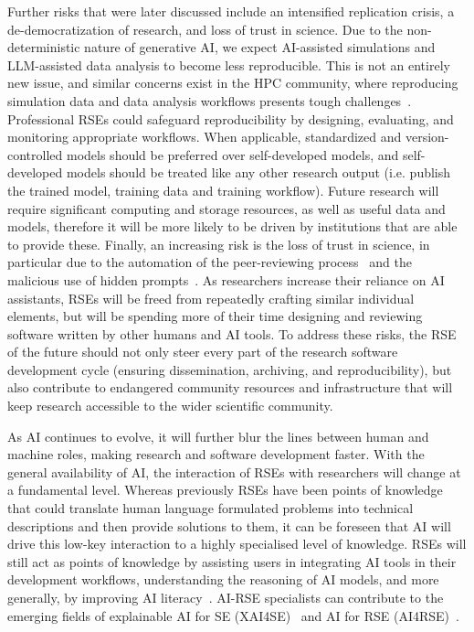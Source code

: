 \documentclass{eceasst}
\begin{document}
Further risks that were later discussed include an intensified replication crisis,
a de-democratization of research, and loss of trust in science.
Due to the non-deterministic nature of generative AI, we expect AI-assisted simulations
and LLM-assisted data analysis to become less reproducible.
This is not an entirely new issue, and similar concerns exist in the HPC community,
where reproducing simulation data and data analysis workflows presents tough challenges~\cite{Antunes2024}.
Professional RSEs could safeguard reproducibility by designing, evaluating, and monitoring appropriate workflows.
When applicable, standardized and version-controlled models should be preferred
over self-developed models, and self-developed models should be treated like any
other research output (i.e. publish the trained model, training data and training workflow).
Future research will require significant computing and storage resources, as well as useful data and models,
therefore it will be more likely to be driven by institutions that are able to provide these.
Finally, an increasing risk is the loss of trust in science,
in particular due to the automation of the peer-reviewing process~\cite{Naddaf2025}
and the malicious use of hidden prompts~\cite{Gibney2025}.
As researchers increase their reliance on AI assistants,
RSEs will be freed from repeatedly crafting similar individual elements,
but will be spending more of their time designing and reviewing software written by other humans and AI tools.
To address these risks, the RSE of the future should not only steer every part
of the research software development cycle (ensuring dissemination, archiving, and reproducibility),
but also contribute to endangered community resources and infrastructure that
will keep research accessible to the wider scientific community.

As AI continues to evolve, it will further blur the lines between human and machine roles, making research and software development faster.
With the general availability of AI, the interaction of RSEs with researchers will change at a fundamental level.
Whereas previously RSEs have been points of knowledge that could translate
human language formulated problems into technical descriptions and then provide solutions to them,
it can be foreseen that AI will drive this low-key interaction to a highly specialised level of knowledge.
RSEs will still act as points of knowledge by assisting users in integrating
AI tools in their development workflows, understanding the reasoning of AI models,
and more generally, by improving AI literacy~\cite{Alenezi2025}.
AI-RSE specialists can contribute to the emerging fields of explainable
AI for SE (XAI4SE)~\cite{Mohammadkhani2023v1} and AI for RSE (AI4RSE)~\cite{Farshidi2025v1}.
\end{document}
